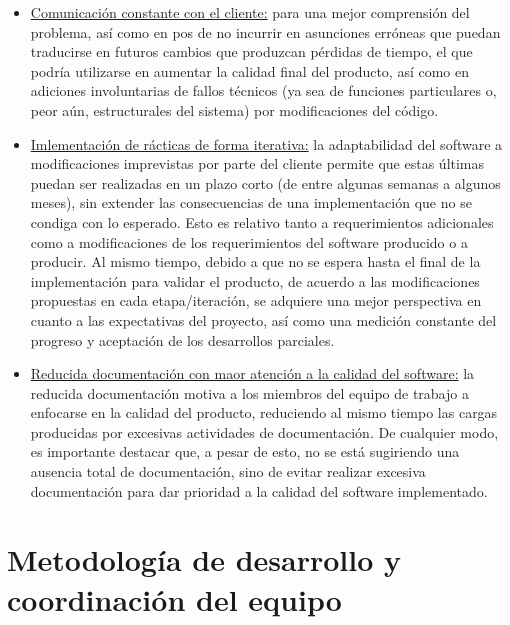 \documentclass[a4paper, 12pt,twoside]{report}  %
\numberwithin{equation}{subsection} %
\begin{document}
\begin{itemize}
	\item \underline{Comunicación constante con el cliente:} para una mejor comprensión del problema, así como en pos de no incurrir en asunciones erróneas que puedan traducirse en futuros cambios que produzcan pérdidas de tiempo, el que podría utilizarse en aumentar la calidad final del producto, así como en adiciones involuntarias de fallos técnicos (ya sea de funciones particulares o, peor aún, estructurales del sistema) por modificaciones del código.
	\item \underline{Imlementación de rácticas de forma iterativa:} la adaptabilidad del software a modificaciones imprevistas por parte del cliente permite que estas últimas puedan ser realizadas en un plazo corto (de entre algunas semanas a algunos meses), sin extender las consecuencias de una implementación que no se condiga con lo esperado. Esto es relativo tanto a requerimientos adicionales como a modificaciones de los requerimientos del software producido o a producir. Al mismo tiempo, debido a que no se espera hasta el final de la implementación para validar el producto, de acuerdo a las modificaciones propuestas en cada etapa/iteración, se adquiere una mejor perspectiva en cuanto a las expectativas del proyecto, así como una medición constante del progreso y aceptación de los desarrollos parciales.
	\item \underline{Reducida documentación con maor atención a la calidad del software:} la reducida documentación motiva a los miembros del equipo de trabajo a enfocarse en la calidad del producto, reduciendo al mismo tiempo las cargas producidas por excesivas actividades de documentación. De cualquier modo, es importante destacar que, a pesar de esto, no se está sugiriendo una ausencia total de documentación, sino de evitar realizar excesiva documentación para dar prioridad a la calidad del software implementado.
\end{itemize}

\section{Metodología de desarrollo y coordinación del equipo}
\label{Metodología de desarrollo y coordinación del equipo}
\end{document}
